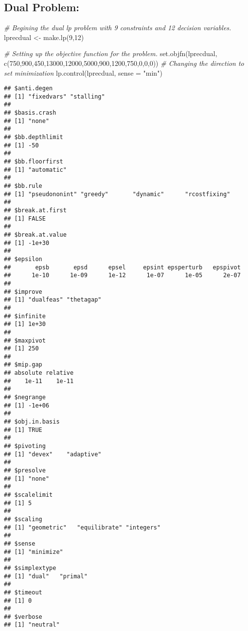 \documentclass[
]{article}
\newenvironment{Shaded}{\begin{snugshade}}{\end{snugshade}}
\newcommand{\AttributeTok}[1]{\textcolor[rgb]{0.77,0.63,0.00}{#1}}
\newcommand{\CommentTok}[1]{\textcolor[rgb]{0.56,0.35,0.01}{\textit{#1}}}
\newcommand{\DecValTok}[1]{\textcolor[rgb]{0.00,0.00,0.81}{#1}}
\newcommand{\FunctionTok}[1]{\textcolor[rgb]{0.00,0.00,0.00}{#1}}
\newcommand{\NormalTok}[1]{#1}
\newcommand{\OtherTok}[1]{\textcolor[rgb]{0.56,0.35,0.01}{#1}}
\newcommand{\StringTok}[1]{\textcolor[rgb]{0.31,0.60,0.02}{#1}}
\begin{document}
\hypertarget{dual-problem}{%
\subsection{Dual Problem:}\label{dual-problem}}

\begin{Shaded}
\begin{Highlighting}[]
\CommentTok{\# Begining the dual lp problem with 9 constraints and 12 decision variables.}
\NormalTok{lprecdual }\OtherTok{\textless{}{-}} \FunctionTok{make.lp}\NormalTok{(}\DecValTok{9}\NormalTok{,}\DecValTok{12}\NormalTok{)}
\end{Highlighting}
\end{Shaded}

\begin{Shaded}
\begin{Highlighting}[]
\CommentTok{\# Setting up the objective function for the problem.}
\FunctionTok{set.objfn}\NormalTok{(lprecdual, }\FunctionTok{c}\NormalTok{(}\DecValTok{750}\NormalTok{,}\DecValTok{900}\NormalTok{,}\DecValTok{450}\NormalTok{,}\DecValTok{13000}\NormalTok{,}\DecValTok{12000}\NormalTok{,}\DecValTok{5000}\NormalTok{,}\DecValTok{900}\NormalTok{,}\DecValTok{1200}\NormalTok{,}\DecValTok{750}\NormalTok{,}\DecValTok{0}\NormalTok{,}\DecValTok{0}\NormalTok{,}\DecValTok{0}\NormalTok{))}
\CommentTok{\# Changing the direction to set minimization}
\FunctionTok{lp.control}\NormalTok{(lprecdual, }\AttributeTok{sense =} \StringTok{"min"}\NormalTok{)}
\end{Highlighting}
\end{Shaded}

\begin{verbatim}
## $anti.degen
## [1] "fixedvars" "stalling" 
## 
## $basis.crash
## [1] "none"
## 
## $bb.depthlimit
## [1] -50
## 
## $bb.floorfirst
## [1] "automatic"
## 
## $bb.rule
## [1] "pseudononint" "greedy"       "dynamic"      "rcostfixing" 
## 
## $break.at.first
## [1] FALSE
## 
## $break.at.value
## [1] -1e+30
## 
## $epsilon
##       epsb       epsd      epsel     epsint epsperturb   epspivot 
##      1e-10      1e-09      1e-12      1e-07      1e-05      2e-07 
## 
## $improve
## [1] "dualfeas" "thetagap"
## 
## $infinite
## [1] 1e+30
## 
## $maxpivot
## [1] 250
## 
## $mip.gap
## absolute relative 
##    1e-11    1e-11 
## 
## $negrange
## [1] -1e+06
## 
## $obj.in.basis
## [1] TRUE
## 
## $pivoting
## [1] "devex"    "adaptive"
## 
## $presolve
## [1] "none"
## 
## $scalelimit
## [1] 5
## 
## $scaling
## [1] "geometric"   "equilibrate" "integers"   
## 
## $sense
## [1] "minimize"
## 
## $simplextype
## [1] "dual"   "primal"
## 
## $timeout
## [1] 0
## 
## $verbose
## [1] "neutral"
\end{verbatim}
\end{document}
